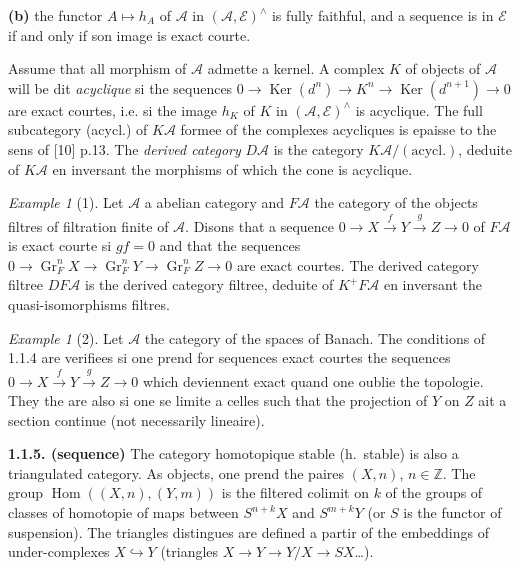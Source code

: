 \documentclass[12pt,a4paper]{article}
\theoremstyle{plain}
\theoremstyle{definition}
\theoremstyle{remark}
\newtheorem{example}[theorem]{Example}
\DeclareMathOperator{\Hom}{Hom}
\DeclareMathOperator{\Ker}{Ker}
\DeclareMathOperator{\Gr}{Gr}
\newcommand{\ZZ}{\mathbb{Z}}
\newcommand{\cA}{\mathcal{A}}
\newcommand{\cE}{\mathcal{E}}
\begin{document}
\medskip

\noindent
\textbf{(b)} the functor $A \mapsto h_{A}$ of $\cA$ in $(\cA, \cE)^{\wedge}$ is fully faithful, and a sequence is in $\cE$ if and only if son image is exact courte.

\medskip

Assume that all morphism of $\cA$ admette a kernel. A complex $K$ of objects of $\cA$ will be dit \emph{acyclique} si the sequences $0 \to \Ker(d^{n}) \to K^{n} \to \Ker(d^{n+1}) \to 0$ are exact courtes, i.e. si the image $h_{K}$ of $K$ in $(\cA, \cE)^{\wedge}$ is acyclique. The full subcategory (acycl.) of $K\cA$ formee of the complexes acycliques is epaisse to the sens of [10] p.13. The \emph{derived category} $D\cA$ is the category $K\cA/(\text{acycl.})$, deduite of $K\cA$ en inversant the morphisms of which the cone is acyclique.

\begin{example}[1]
Let $\cA$ a abelian category and $F\cA$ the category of the objects filtres of filtration finite of $\cA$. Disons that a sequence $0 \to X \xrightarrow{f} Y \xrightarrow{g} Z \to 0$ of $F\cA$ is exact courte si $gf = 0$ and that the sequences $0 \to \Gr^{n}_{F}X \to \Gr^{n}_{F}Y \to \Gr^{n}_{F}Z \to 0$ are exact courtes. The derived category filtree $DF\cA$ is the derived category filtree, deduite of $K^{+}F\cA$ en inversant the quasi-isomorphisms filtres.
\end{example}

\begin{example}[2]
Let $\cA$ the category of the spaces of Banach. The conditions of 1.1.4 are verifiees si one prend for sequences exact courtes the sequences $0 \to X \xrightarrow{f} Y \xrightarrow{g} Z \to 0$ which deviennent exact quand one oublie the topologie. They the are also si one se limite a celles such that the projection of $Y$ on $Z$ ait a section continue (not necessarily lineaire).
\end{example}

\medskip

\noindent
\textbf{1.1.5. (sequence)} The category homotopique stable (h.~stable) is also a triangulated category. As objects, one prend the paires $(X, n)$, $n \in \ZZ$. The group $\Hom((X, n), (Y, m))$ is the filtered colimit on $k$ of the groups of classes of homotopie of maps between $S^{n+k}X$ and $S^{m+k}Y$ (or $S$ is the functor of suspension). The triangles distingues are defined a partir of the embeddings of under-complexes $X \hookrightarrow Y$ (triangles $X \to Y \to Y/X \to SX$\ldots).
\end{document}
